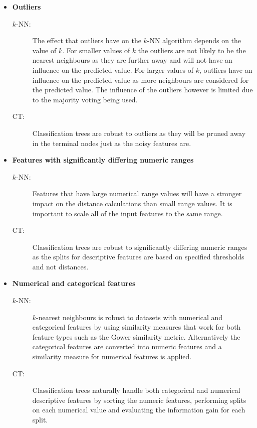 \documentclass[conference]{IEEEtran}
\begin{document}
\begin{itemize}
		\item \textbf{Outliers}  
		\begin{description}
			\item [$k$-NN:] The effect that outliers have on the $k$-NN algorithm depends on the value of $k$. For smaller values of $k$ the outliers are not likely to be the nearest neighbours as they are further away and will not have an influence on the predicted value. For larger values of $k$, outliers have an influence on the predicted value as more neighbours are considered for the predicted value. The influence of the outliers however is limited due to the majority voting being used.
			\item [CT:] Classification trees are robust to outliers as they will be pruned away in the terminal nodes just as the noisy features are.
		\end{description}
		
		\item \textbf{Features with significantly differing numeric ranges}  
		\begin{description}
			\item [$k$-NN:] Features that have large numerical range values will have a stronger impact on the distance calculations than small range values. It is important to scale all of the input features to the same range.
			\item [CT:] Classification trees are robust to significantly differing numeric ranges as the splits for descriptive features are based on specified thresholds and not distances.
		\end{description}
		
		\item \textbf{Numerical and categorical features}  
		\begin{description}
			\item [$k$-NN:] $k$-nearest neighbours is robust to datasets with numerical and categorical features by using similarity measures that work for both feature types such as the Gower similarity metric. Alternatively the categorical features are converted into numeric features and a similarity measure for numerical features is applied. 
			\item [CT:] Classification trees naturally handle both categorical and numerical descriptive features by sorting the numeric features, performing splits on each numerical value and evaluating the information gain for each split.
		\end{description}
		

\end{itemize}
\end{document}
